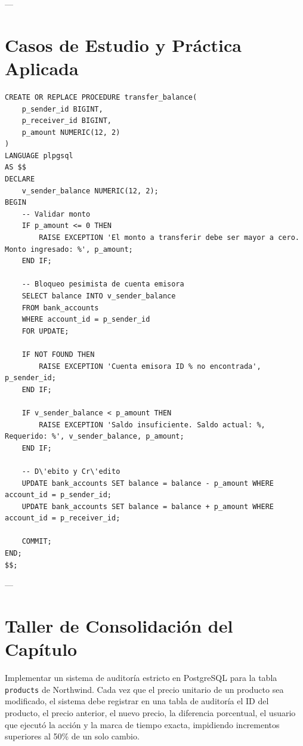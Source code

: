 ---

\section{Casos de Estudio y Pr\'actica Aplicada}

\begin{lstlisting}[style=sqlstyle, caption={Procedimiento almacenado con transacci\'on y validaci\'on de saldo}]
CREATE OR REPLACE PROCEDURE transfer_balance(
    p_sender_id BIGINT,
    p_receiver_id BIGINT,
    p_amount NUMERIC(12, 2)
)
LANGUAGE plpgsql
AS $$
DECLARE
    v_sender_balance NUMERIC(12, 2);
BEGIN
    -- Validar monto
    IF p_amount <= 0 THEN
        RAISE EXCEPTION 'El monto a transferir debe ser mayor a cero. Monto ingresado: %', p_amount;
    END IF;

    -- Bloqueo pesimista de cuenta emisora
    SELECT balance INTO v_sender_balance
    FROM bank_accounts
    WHERE account_id = p_sender_id
    FOR UPDATE;

    IF NOT FOUND THEN
        RAISE EXCEPTION 'Cuenta emisora ID % no encontrada', p_sender_id;
    END IF;

    IF v_sender_balance < p_amount THEN
        RAISE EXCEPTION 'Saldo insuficiente. Saldo actual: %, Requerido: %', v_sender_balance, p_amount;
    END IF;

    -- D\'ebito y Cr\'edito
    UPDATE bank_accounts SET balance = balance - p_amount WHERE account_id = p_sender_id;
    UPDATE bank_accounts SET balance = balance + p_amount WHERE account_id = p_receiver_id;

    COMMIT;
END;
$$;
\end{lstlisting}

---

\section{Taller de Consolidaci\'on del Cap\'itulo}

\begin{businessproblem}
Implementar un sistema de auditor\'ia estricto en PostgreSQL para la tabla \texttt{products} de Northwind. Cada vez que el precio unitario de un producto sea modificado, el sistema debe registrar en una tabla de auditor\'ia el ID del producto, el precio anterior, el nuevo precio, la diferencia porcentual, el usuario que ejecut\'o la acci\'on y la marca de tiempo exacta, impidiendo incrementos superiores al 50\% de un solo cambio.
\end{businessproblem}

